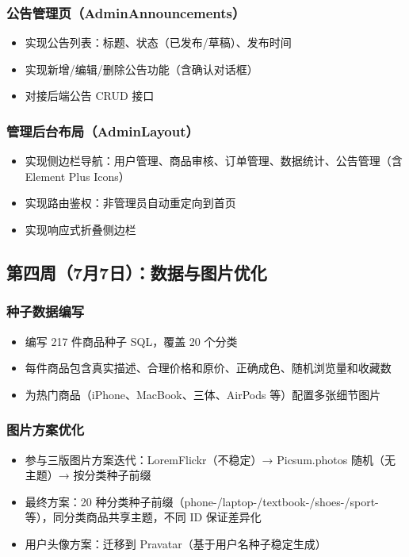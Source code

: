 \documentclass[12pt,a4paper]{ctexart}
\begin{document}
\subsubsection*{公告管理页（AdminAnnouncements）}
\begin{itemize}
    \item 实现公告列表：标题、状态（已发布/草稿）、发布时间
    \item 实现新增/编辑/删除公告功能（含确认对话框）
    \item 对接后端公告 CRUD 接口
\end{itemize}

\subsubsection*{管理后台布局（AdminLayout）}
\begin{itemize}
    \item 实现侧边栏导航：用户管理、商品审核、订单管理、数据统计、公告管理（含 Element Plus Icons）
    \item 实现路由鉴权：非管理员自动重定向到首页
    \item 实现响应式折叠侧边栏
\end{itemize}

\subsection{第四周（7月7日）：数据与图片优化}

\subsubsection*{种子数据编写}
\begin{itemize}
    \item 编写 217 件商品种子 SQL，覆盖 20 个分类
    \item 每件商品包含真实描述、合理价格和原价、正确成色、随机浏览量和收藏数
    \item 为热门商品（iPhone、MacBook、三体、AirPods 等）配置多张细节图片
\end{itemize}

\subsubsection*{图片方案优化}
\begin{itemize}
    \item 参与三版图片方案迭代：LoremFlickr（不稳定）→ Picsum.photos 随机（无主题）→ 按分类种子前缀
    \item 最终方案：20 种分类种子前缀（phone-/laptop-/textbook-/shoes-/sport- 等），同分类商品共享主题，不同 ID 保证差异化
    \item 用户头像方案：迁移到 Pravatar（基于用户名种子稳定生成）
\end{itemize}
\end{document}
